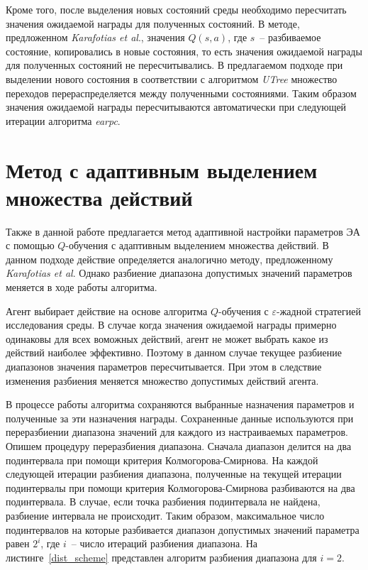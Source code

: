 Кроме того, после выделения новых состояний среды необходимо пересчитать значения ожидаемой награды для полученных состояний. В методе, предложенном \textit{Karafotias et al}., значения $Q(s, a)$, где $s$~-- разбиваемое состояние, копировались в новые состояния, то есть значения ожидаемой награды для полученных состояний не пересчитывались. В предлагаемом подходе при выделении нового состояния в соответствии с алгоритмом \textit{UTree} множество переходов перераспределяется между полученными состояниями. Таким образом значения ожидаемой награды пересчитываются автоматически при следующей итерации алгоритма \textit{earpc}.

\section{Метод с адаптивным выделением множества действий}
\label{adaptive_method}

Также в данной работе предлагается метод адаптивной настройки параметров ЭА с помощью $Q$-обучения с адаптивным выделением множества действий. В данном подходе действие определяется аналогично методу, предложенному \textit{Karafotias et al}. Однако разбиение диапазона допустимых значений параметров меняется в ходе работы алгоритма.

Агент выбирает действие на основе алгоритма $Q$-обучения с $\varepsilon$-жадной стратегией исследования среды. В случае когда значения ожидаемой награды примерно одинаковы для всех воможных действий, агент не может выбрать какое из действий наиболее эффективно. Поэтому в данном случае текущее разбиение диапазонов значения параметров пересчитывается. При этом в следствие изменения разбиения меняется множество допустимых действий агента.

В процессе работы алгоритма сохраняются выбранные назначения параметров и полученные за эти назначения награды.  Сохраненные данные используются при переразбиении диапазона значений для каждого из настраиваемых параметров. Опишем процедуру переразбиения диапазона. Сначала диапазон делится на два подинтервала при помощи критерия Колмогорова-Смирнова. На каждой следующей итерации разбиения диапазона, полученные на текущей итерации подинтервалы при помощи критерия Колмогорова-Смирнова разбиваются на два подинтервала. В случае, если точка разбиения подинтервала не найдена, разбиение интервала не происходит. Таким образом, максимальное число подинтервалов на которые разбивается диапазон допустимых значений параметра равен $2^i$, где $i$~-- число итераций разбиения диапазона. На листинге~\ref{dist_scheme} представлен алгоритм разбиения диапазона для $i = 2$.


